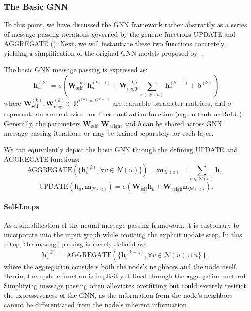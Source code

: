 \subsubsection{The Basic GNN}
To this point, we have discussed the GNN framework rather abstractly as a series of message-passing iterations governed by the generic functions UPDATE and AGGREGATE (). Next, we will instantiate these two functions concretely, yielding a simplification of the original GNN models proposed by~\cite{Merkwirth2005automaticGenerationComplementaryDescriptorsMolecularGraphNetworks}\cite{scarselli2008graphNeuralNetworkModel}.

The basic GNN message passing is expressed as:
\begin{equation}\label{eq:basicGNNAGGUP}
    \mathbf{h}_u^{(k)} = \sigma\left(\mathbf{W}_\text{self}^{(k)}\mathbf{h}_u^{(k-1)} + \mathbf{W}_\text{neigh}^{(k)}\sum_{v\in\mathcal{N}(u)}\mathbf{h}_v^{(k-1)} + \mathbf{b}^{(k)}\right)
\end{equation}
where $ \mathbf{W}_\text{self}^{(k)}, \mathbf{W}_\text{neigh}^{(k)} \in \mathbb{R}^{d^{(k)}\times d^{(k-1)}} $ are learnable parameter matrices, and $ \sigma $ represents an element-wise non-linear activation function (e.g., a tanh or ReLU). Generally, the parameters $ \mathbf{W}_\text{self}, \mathbf{W}_\text{neigh} $, and $ b $ can be shared across GNN message-passing iterations or may be trained separately for each layer.

We can equivalently depict the basic GNN through the defining UPDATE and AGGREGATE functions:
\begin{equation*}
    \text{AGGREGATE}(\{\mathbf{h}_v^{(k)}, \forall v \in \mathcal{N}(u)\}) =
    \mathbf{m}_{\mathcal{N}(u)} = \sum_{v\in\mathcal{N}(u)}\mathbf{h}_v,
\end{equation*}
\begin{equation}\label{eq:updateBase}
    \text{UPDATE}(\mathbf{h}_u, \mathbf{m}_{\mathcal{N}(u)}) = \sigma(\mathbf{W}_\text{self}\mathbf{h}_u + \mathbf{W}_\text{neigh}\mathbf{m}_{\mathcal{N}(u)}).
\end{equation}

\paragraph{Self-Loops}
As a simplification of the neural message passing framework, it is customary to incorporate  into the input graph while omitting the explicit update step. In this setup, the message passing is merely defined as:
\begin{equation*}
    \mathbf{h}_u^{(k)} = \text{AGGREGATE}(\{\mathbf{h}_v^{(k-1)}, \forall v \in \mathcal{N}(u)\cup {u}\}),
\end{equation*}
where the aggregation considers both the node's neighbors and the node itself. Herein, the update function is implicitly defined through the aggregation method. Simplifying message passing often alleviates overfitting but could severely restrict the expressiveness of the GNN, as the information from the node's neighbors cannot be differentiated from the node's inherent information.

